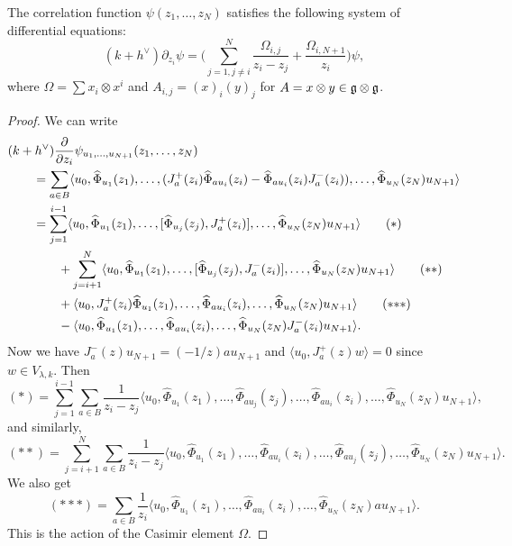 \begin{theorem}\label{thm:KZ}
  The correlation function 
  $\psi(z_1, \dots, z_N)$ satisfies the
  following system of differential equations:
  \[
    (k + h^\vee) \partial_{z_i} \psi
    = \bigg(
      \sum_{j = 1, j \ne i}^N \frac{\Omega_{i, j}}{z_i - z_j} + \frac{\Omega_{i, N + 1}}{z_i}
    \bigg) \psi,
  \]
  where $\Omega = \sum x_i \otimes x^i$ and
  $A_{i, j} = (x)_i (y)_j$
  for $A = x \otimes y \in \mathfrak{g} \otimes \mathfrak{g}$.
\end{theorem}

\begin{proof}
  We can write
  \begin{align*}
    &(k + h^\vee) \frac{\partial}{\partial z_i} \psi_{u_1, \dots, u_{N + 1}}(z_1, \dots, z_N) \\
    &\quad \quad= \sum_{a \in B}
    \langle u_0, \widehat{\Phi}_{u_1}(z_1),
    \dots, (J_a^+(z_i) \widehat{\Phi}_{au_i}(z_i) - \widehat{\Phi}_{au_i}(z_i)J_a^-(z_i)), \dots,
    \widehat{\Phi}_{u_N}(z_N) u_{N + 1} \rangle \\
    &\quad \quad= \sum_{j = 1}^{i - 1}
    \langle u_0, \widehat{\Phi}_{u_1}(z_1), \dots, [\widehat{\Phi}_{u_j}(z_j), J_a^+(z_i)], \dots, \widehat{\Phi}_{u_N}(z_N) u_{N + 1} \rangle \tag{$*$} \\
    &\quad \quad \quad \quad
    + \sum_{j = i + 1}^N
    \langle u_0, \widehat{\Phi}_{u_1}(z_1), \dots, [\widehat{\Phi}_{u_j}(z_j), J_a^-(z_i)], \dots, \widehat{\Phi}_{u_N}(z_N) u_{N + 1} \rangle \tag{$**$} \\
    &\quad \quad \quad \quad +
    \langle u_0, J_a^+(z_i) \widehat{\Phi}_{u_1}(z_1), \dots, \widehat{\Phi}_{au_i}(z_i), \dots, \widehat{\Phi}_{u_N}(z_N) u_{N + 1} \rangle \tag{$*{*}*$} \\
    & \quad \quad \quad \quad -
    \langle u_0, \widehat{\Phi}_{u_1}(z_1), \dots, \widehat{\Phi}_{au_i}(z_i), \dots, \widehat{\Phi}_{u_N}(z_N) J_a^-(z_i) u_{N + 1} \rangle.
  \end{align*}
  Now we have $J_a^-(z) u_{N + 1} = (-1 / z) a u_{N + 1}$ and
  $\langle u_0, J_a^+(z) w \rangle = 0$
  since $w \in V_{\lambda, k}$.
  Then
  \[
    (*)
    = \sum_{j = 1}^{i - 1} \sum_{a \in B}
    \frac{1}{z_i - z_j} \langle u_0,
    \widehat{\Phi}_{u_1}(z_1), \dots,
    \widehat{\Phi}_{au_j}(z_j), \dots,
    \widehat{\Phi}_{au_i}(z_i), \dots, \widehat{\Phi}_{u_N}(z_N) u_{N + 1} \rangle,
  \]
  and similarly,
  \[
    (**)
    = \sum_{j = i + 1}^N \sum_{a \in B}
    \frac{1}{z_i - z_j} \langle u_0,
    \widehat{\Phi}_{u_1}(z_1), \dots,
    \widehat{\Phi}_{au_i}(z_i), \dots,
    \widehat{\Phi}_{au_j}(z_j), \dots, \widehat{\Phi}_{u_N}(z_N) u_{N + 1} \rangle.
  \]
  We also get
  \[
    (*{*}*)
    = \sum_{a \in B} \frac{1}{z_i}
    \langle u_0, \widehat{\Phi}_{u_1}(z_1), \dots,
    \widehat{\Phi}_{au_i}(z_i), \dots, \widehat{\Phi}_{u_N}(z_N) a u_{N + 1} \rangle.
  \]
  This is the action of
  the Casimir element $\Omega$.
\end{proof}

